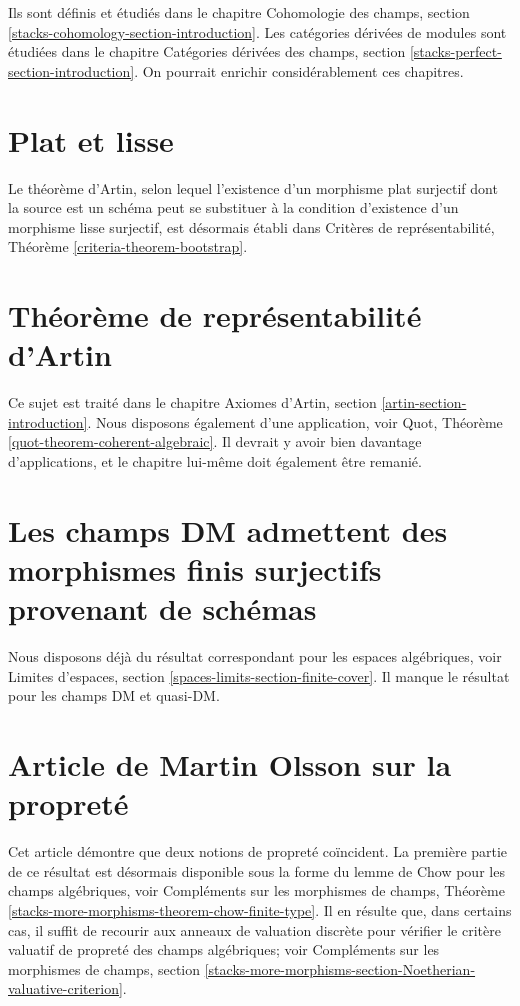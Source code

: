 \noindent
Ils sont définis et étudiés dans le chapitre
Cohomologie des champs, section \ref{stacks-cohomology-section-introduction}.
Les catégories dérivées de modules sont étudiées dans le chapitre
Catégories dérivées des champs, section \ref{stacks-perfect-section-introduction}.
On pourrait enrichir considérablement ces chapitres.



\section{Plat et lisse}
\label{section-flat-smooth}

\noindent
Le théorème d'Artin, selon lequel l'existence d'un morphisme plat surjectif dont la source est un schéma
peut se substituer à la condition d'existence d'un morphisme lisse surjectif, est désormais établi dans
Critères de représentabilité, Théorème \ref{criteria-theorem-bootstrap}.


\section{Théorème de représentabilité d'Artin}
\label{section-representability}

\noindent
Ce sujet est traité dans le chapitre
Axiomes d'Artin, section \ref{artin-section-introduction}.
Nous disposons également d'une application, voir
Quot, Théorème \ref{quot-theorem-coherent-algebraic}.
Il devrait y avoir bien davantage d'applications, et le chapitre
lui-même doit également être remanié.


\section{Les champs DM admettent des morphismes finis surjectifs provenant de schémas}
\label{section-dm-finite-cover}

\noindent
Nous disposons déjà du résultat correspondant pour les espaces algébriques, voir
Limites d'espaces, section \ref{spaces-limits-section-finite-cover}.
Il manque le résultat pour les champs DM et quasi-DM.


\section{Article de Martin Olsson sur la propreté}
\label{section-proper-parametrization}

\noindent
Cet article démontre que deux notions de propreté coïncident. La première partie de ce résultat
est désormais disponible sous la forme du lemme de Chow pour les champs algébriques, voir
Compléments sur les morphismes de champs, Théorème
\ref{stacks-more-morphisms-theorem-chow-finite-type}.
Il en résulte que, dans certains cas, il suffit de recourir aux anneaux de valuation discrète
pour vérifier le critère valuatif de propreté
des champs algébriques; voir
Compléments sur les morphismes de champs, section
\ref{stacks-more-morphisms-section-Noetherian-valuative-criterion}.


